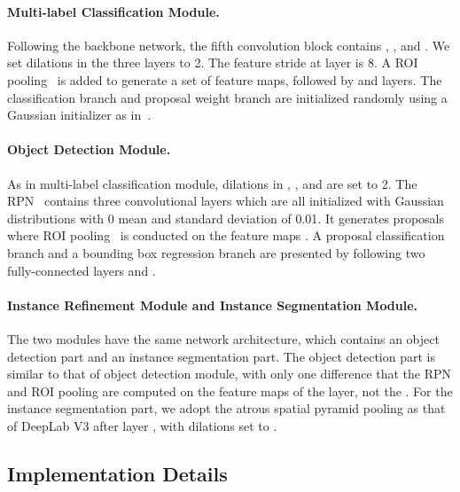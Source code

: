 \documentclass[10pt,twocolumn,letterpaper]{article}
\begin{document}
\paragraph{Multi-label Classification Module.} Following the backbone network, the fifth convolution block contains , , and . We set dilations in the three layers to 2. The feature stride  at layer  is 8. A ROI pooling~\cite{girshick2015fast} is added to generate a set of  feature maps, followed by  and  layers.
The classification branch and proposal weight branch are initialized randomly using a Gaussian initializer as in~\cite{he2016deep}.
\vspace{-4mm}

\paragraph{Object Detection Module.} As in multi-label classification module, dilations in , , and  are set to 2. The RPN~\cite{renNIPS15fasterrcnn} contains three convolutional layers which are all initialized with Gaussian distributions with 0 mean and standard deviation of 0.01. It generates proposals where ROI pooling~\cite{girshick2015fast} is conducted on the feature maps . A proposal classification branch and a bounding box regression branch are presented by following two fully-connected layers  and .
\vspace{-4mm}

\paragraph{Instance Refinement Module and Instance Segmentation Module.} The two modules have the same network architecture, which contains an object detection part and an instance segmentation part. The object detection part is similar to that of object detection module, with only one difference that the RPN and ROI pooling are computed on the feature maps of the  layer, not the . For the instance segmentation part, we adopt the atrous spatial pyramid pooling as that of DeepLab V3 \cite{chen2017rethinking} after layer , with dilations set to  .


\subsection{Implementation Details}
\end{document}
